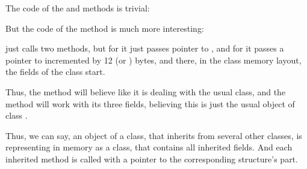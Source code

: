 The code of the  and  methods is trivial:






But the code of the  method is much more interesting:




 just calls two methods, but for  it just passes pointer to ,
and for  it passes a pointer to  incremented by 12 (or ) bytes, and there,
in the 
class memory layout, the fields of the  class start.


Thus, the  method will believe like it is dealing with the usual  class,
and the  method will work with its three fields, believing this is just the usual object of class .


Thus, we can say, an object of a class,
that inherits from several other classes, is representing in memory as a  class, that contains all inherited fields.
And each inherited method is called with a pointer to 
the corresponding structure's part.

